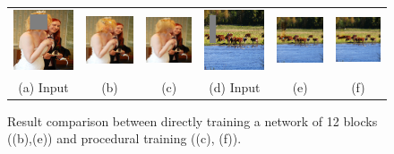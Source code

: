 \begin{figure}[h!]
\centering
\small
\begin{tabular}{cccccc}
\includegraphics[width=.16\textwidth]{figures/proc/000000241668_input_image.jpg}&
\includegraphics[width=.16\textwidth]{figures/proc/000000241668_synthesized_image-1.jpg}&
\includegraphics[width=.16\textwidth]{figures/proc/000000241668_synthesized_image.jpg}&
\includegraphics[width=.16\textwidth]{figures/proc/000000314034_input_image.jpg}&
\includegraphics[width=.16\textwidth]{figures/proc/000000314034_synthesized_image-1.jpg}&
\includegraphics[width=.16\textwidth]{figures/proc/000000314034_synthesized_image.jpg}\\
(a) Input & (b)  & (c)  & (d) Input & (e)  & (f)  \\
\end{tabular}
\caption{Result comparison between directly training a network of 12 blocks ((b),(e)) and procedural training ((c), (f)).}
\label{fig:proc}
\vspace{-10pt}
\end{figure}  

